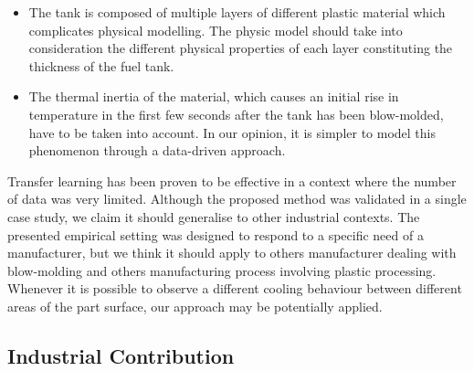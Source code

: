 \begin{itemize}
    \item The tank is composed of multiple layers of different plastic material which complicates physical modelling. The physic model should take into consideration the different physical properties of each layer constituting the thickness of the fuel tank.
    \item The thermal inertia of the material, which causes an initial rise in temperature in the first few seconds after the tank has been blow-molded, have to be taken into account. In our opinion, it is simpler to model this phenomenon through a data-driven approach. 
\end{itemize}

Transfer learning has been proven to be effective in a context where the number of data was very limited. Although the proposed method was validated in a single case study, we claim it should generalise to other industrial contexts. The presented empirical setting was designed to respond to a specific need of a manufacturer, but we think it should apply to others manufacturer dealing with blow-molding and others manufacturing process involving plastic processing. Whenever it is possible to observe a different cooling behaviour between different areas of the part surface, our approach may be potentially applied.


\subsection{Industrial Contribution}

